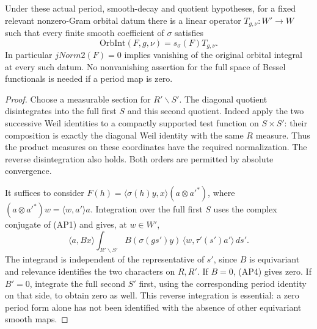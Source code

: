 \begin{theorem}
\label{thm:all-cell-relative-factorization}
Under these actual period, smooth-decay and quotient
hypotheses, for a fixed relevant nonzero-Gram orbital
datum there is a linear operator \(T_{g,\nu}:W'\to W\)
such that every finite smooth coefficient of \(\sigma\)
satisfies
\[
             \mathrm{OrbInt}(F,g,\nu)
                     =s_\sigma(F)T_{g,\nu}.             \tag{AP3}
\]
In particular \(jNorm2(F)=0\) implies vanishing of
the original orbital integral at every such datum.
No nonvanishing assertion for the full space of Bessel
functionals is needed if a period map is zero.
\end{theorem}

\begin{proof}
Choose a measurable section for \(R'\backslash S'\).
The diagonal quotient disintegrates into the full
first \(S\) and this second quotient. Indeed apply
the two successive Weil identities to a compactly
supported test function on \(S\times S'\): their
composition is exactly the diagonal Weil identity
with the same \(R\) measure. Thus the product measures
on these coordinates have the required normalization.
The reverse disintegration also holds. Both orders
are permitted by absolute convergence.

It suffices to consider
\(F(h)=\langle\sigma(h)y,x\rangle (a\otimes a'^*)\),
where \((a\otimes a'^*)w=\langle w,a'\rangle a\).
Integration over the full first \(S\) uses the complex
conjugate of (AP1) and gives, at \(w\in W'\),
\[
  \langle a,Bx\rangle
        \int_{R'\backslash S'}
           B(\sigma(gs')y)\,
                     \langle w,\tau'(s')a'\rangle\,d\dot s'.
                                                        \tag{AP4}
\]
The integrand is independent of the representative
of \(s'\), since \(B\) is equivariant and relevance
identifies the two characters on \(R,R'\).
If \(B=0\), (AP4) gives zero. If \(B'=0\), integrate the
full second \(S'\) first, using the corresponding
period identity on that side, to obtain zero as well.
This reverse integration is essential: a zero period
form alone has not been identified with the absence
of other equivariant smooth maps.


\end{proof}
